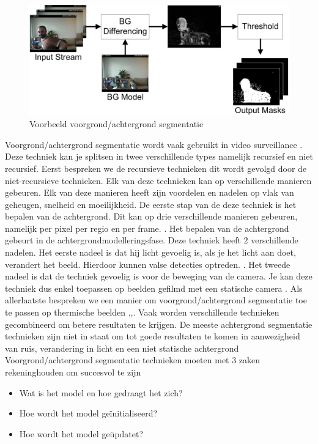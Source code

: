 \begin{figure}[hbp]
	\includegraphics[scale=0.65]{BackgroundSegmentation}
	\caption{Voorbeeld voorgrond/achtergrond segmentatie}
	\label{imgVAS}
\end{figure}

Voorgrond/achtergrond segmentatie wordt vaak gebruikt in video surveillance \cite{bibBET3}. Deze techniek kan je splitsen in twee verschillende types namelijk recursief en niet recursief. Eerst bespreken we de recursieve technieken dit wordt gevolgd door de niet-recursieve technieken. Elk van deze technieken kan op verschillende manieren gebeuren. Elk van deze manieren heeft zijn voordelen en nadelen op vlak van geheugen, snelheid en moeilijkheid. De eerste stap van de deze techniek is het bepalen van de achtergrond. Dit kan op drie verschillende manieren gebeuren, namelijk per pixel per regio en per frame. \cite{bibBET4}.  Het bepalen  van de achtergrond gebeurt in de achtergrondmodelleringsfase. Deze techniek heeft 2 verschillende nadelen. Het eerste nadeel is dat hij licht gevoelig is, als je het licht aan doet, verandert het beeld. Hierdoor kunnen valse detecties optreden.  \cite{bibBET4}. Het tweede nadeel is dat de techniek gevoelig is voor de beweging van de camera. Je kan deze techniek dus enkel toepassen op beelden gefilmd met een statische camera \cite{bibBET7}. Als allerlaatste bespreken we een manier om voorgrond/achtergrond segmentatie toe te passen op thermische beelden \cite{bibBET5},\cite{bibBEt},\cite{bibBET2}. Vaak worden verschillende technieken gecombineerd om betere resultaten te krijgen. De meeste achtergrond segmentatie technieken  zijn niet in staat om tot goede resultaten te komen in aanwezigheid van ruis, verandering in licht en een niet statische achtergrond \cite{bibBET9}\\
Voorgrond/achtergrond segmentatie technieken moeten met 3 zaken rekeninghouden om succesvol te zijn
\begin{itemize}
	\item Wat is het model en hoe gedraagt het zich?
	\item Hoe wordt het model ge\"initialiseerd?
	\item Hoe wordt het model ge\"updatet?
\end{itemize}
\cite{bibBET8}


